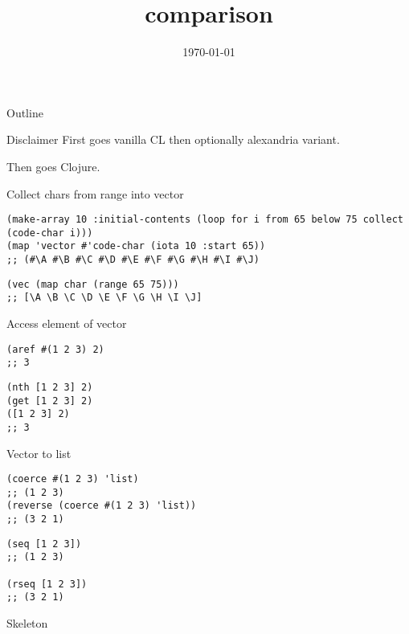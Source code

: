 \documentclass[presentation]{beamer}
\author{}
\date{\today}
\title{comparison}
\begin{document}
\maketitle
\begin{frame}{Outline}
\tableofcontents
\end{frame}

\begin{frame}[label=sec-1]{Disclaimer}
First goes vanilla CL then optionally alexandria variant.

Then goes Clojure.
\end{frame}
\begin{frame}[fragile,label=sec-2]{Collect chars from range into vector}
 \begin{verbatim}
(make-array 10 :initial-contents (loop for i from 65 below 75 collect (code-char i)))
(map 'vector #'code-char (iota 10 :start 65))
;; (#\A #\B #\C #\D #\E #\F #\G #\H #\I #\J)
\end{verbatim}

\begin{verbatim}
(vec (map char (range 65 75)))
;; [\A \B \C \D \E \F \G \H \I \J]
\end{verbatim}
\end{frame}
\begin{frame}[fragile,label=sec-3]{Access element of vector}
 \begin{verbatim}
(aref #(1 2 3) 2)
;; 3
\end{verbatim}

\begin{verbatim}
(nth [1 2 3] 2)
(get [1 2 3] 2)
([1 2 3] 2)
;; 3
\end{verbatim}
\end{frame}
\begin{frame}[fragile,label=sec-4]{Vector to list}
 \begin{verbatim}
(coerce #(1 2 3) 'list)
;; (1 2 3)
(reverse (coerce #(1 2 3) 'list))
;; (3 2 1)
\end{verbatim}

\begin{verbatim}
(seq [1 2 3])
;; (1 2 3)

(rseq [1 2 3])
;; (3 2 1)
\end{verbatim}
\end{frame}
\begin{frame}[fragile,label=sec-5]{Skeleton}
\end{frame}
\end{document}
